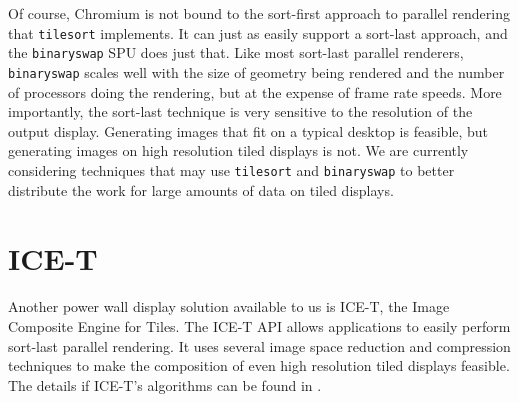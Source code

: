 \documentclass{acmsiggraph}
\newcommand{\cidentifier}[1]{\texttt{#1}}
\begin{document}
  Of course, Chromium is not bound to the sort-first approach to parallel
  rendering that \cidentifier{tile\-sort} implements.  It can just as
  easily support a sort-last approach, and the \cidentifier{binary\-swap}
  SPU does just that.  Like most sort-last parallel renderers,
  \cidentifier{binary\-swap} scales well with the size of geometry being
  rendered and the number of processors doing the rendering, but at the
  expense of frame rate speeds.  More importantly, the sort-last technique
  is very sensitive to the resolution of the output display.  Generating
  images that fit on a typical desktop is feasible, but generating images
  on high resolution tiled displays is not.  We are currently considering
  techniques that may use \cidentifier{tile\-sort} and
  \cidentifier{binary\-swap} to better distribute the work for large
  amounts of data on tiled displays.



  \section{ICE-T}
  \label{sec:ICE-T}

  Another power wall display solution available to us is ICE-T, the Image
  Composite Engine for Tiles.  The ICE-T API allows applications to easily
  perform sort-last parallel rendering.  It uses several image space
  reduction and compression techniques to make the composition of even high
  resolution tiled displays feasible.  The details if ICE-T's algorithms
  can be found in \cite{Moreland01}.
\end{document}
